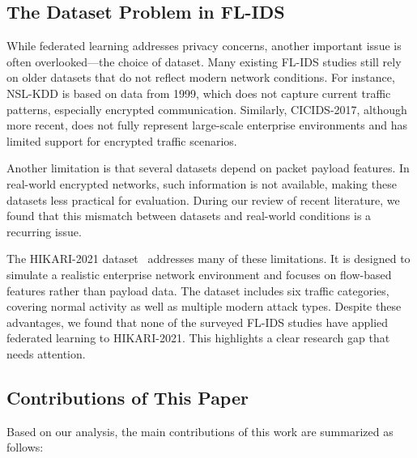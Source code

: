 \documentclass[conference]{IEEEtran}
\begin{document}
\subsection{The Dataset Problem in FL-IDS}

While federated learning addresses privacy concerns, another important issue is often overlooked—the choice of dataset. Many existing FL-IDS studies still rely on older datasets that do not reflect modern network conditions. For instance, NSL-KDD is based on data from 1999, which does not capture current traffic patterns, especially encrypted communication. Similarly, CICIDS-2017, although more recent, does not fully represent large-scale enterprise environments and has limited support for encrypted traffic scenarios.

Another limitation is that several datasets depend on packet payload features. In real-world encrypted networks, such information is not available, making these datasets less practical for evaluation. During our review of recent literature, we found that this mismatch between datasets and real-world conditions is a recurring issue.

The HIKARI-2021 dataset~\cite{ferriyan2021} addresses many of these limitations. It is designed to simulate a realistic enterprise network environment and focuses on flow-based features rather than payload data. The dataset includes six traffic categories, covering normal activity as well as multiple modern attack types. Despite these advantages, we found that none of the surveyed FL-IDS studies have applied federated learning to HIKARI-2021. This highlights a clear research gap that needs attention.

\subsection{Contributions of This Paper}

Based on our analysis, the main contributions of this work are summarized as follows:
\end{document}
